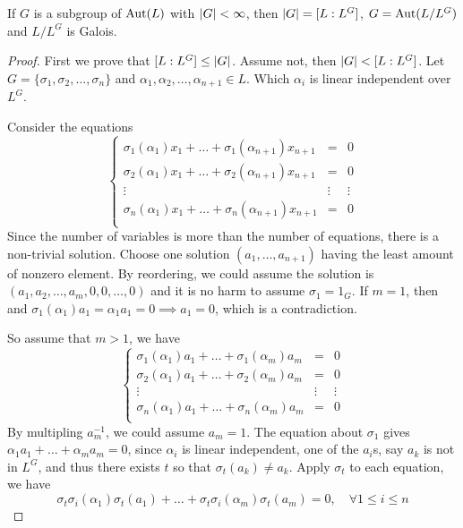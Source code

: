 \begin{theorem} \label{thm:extension-of-fix-field-is-galois}
  If $G$ is a subgroup of $\operatorname{Aut}(L)$ with $\lvert G\rvert < \infty$, then $\lvert G\rvert = [L: L^G]$, $G = \operatorname{Aut}(L / L^G)$
  and $L / L^G$ is Galois.

  \begin{proof}
    First we prove that $[L: L^G] \leq \lvert G\rvert$. Assume not, then $\lvert G\rvert < [L: L^G]$.
    Let $G = \{\sigma_1, \sigma_2, \dots, \sigma_n\}$ and $\alpha_1, \alpha_2, \dots, \alpha_{n+1} \in L$.
    Which $\alpha_i$ is linear independent over $L^G$.

    Consider the equations
    \[
      \left\{
        \begin{array}{ccc}
          \sigma_1(\alpha_1) x_1 + \dots + \sigma_1(\alpha_{n+1}) x_{n+1} &=& 0 \\
          \sigma_2(\alpha_1) x_1 + \dots + \sigma_2(\alpha_{n+1}) x_{n+1} &=& 0 \\
          \vdots &\vdots& \vdots \\
          \sigma_n(\alpha_1) x_1 + \dots + \sigma_n(\alpha_{n+1}) x_{n+1} &=& 0 \\
        \end{array}
      \right.
    \]
    Since the number of variables is more than the number of equations, there is a
    non-trivial solution. Choose one solution $(a_1, \dots, a_{n+1})$ having the
    least amount of nonzero element. By reordering, we could assume
    the solution is $(a_1, a_2, \dots, a_m, 0, 0, \dots, 0)$ and it is no harm to assume $\sigma_1 = 1_G$.
    If $m = 1$, then and $\sigma_1(\alpha_1) a_1 = \alpha_1 a_1 = 0 \implies a_1 = 0$,
    which is a contradiction.

    So assume that $m > 1$, we have
    \[
      \left\{
        \begin{array}{ccc}
          \sigma_1(\alpha_1) a_1 + \dots + \sigma_1(\alpha_{m}) a_{m} &=& 0 \\
          \sigma_2(\alpha_1) a_1 + \dots + \sigma_2(\alpha_{m}) a_{m} &=& 0 \\
          \vdots &\vdots& \vdots \\
          \sigma_n(\alpha_1) a_1 + \dots + \sigma_n(\alpha_{m}) a_{m} &=& 0 \\
        \end{array}
      \right.
    \]
    By multipling $a_m^{-1}$, we could assume $a_m = 1$. The equation about $\sigma_1$ gives
    $\alpha_1 a_1 + \dots + \alpha_m a_m = 0$, since $\alpha_i$ is linear independent,
    one of the $a_i$s, say $a_k$ is not in $L^G$, and thus there exists $t$ so that $\sigma_t(a_k) \neq a_k$.
    Apply $\sigma_t$ to each equation, we have
    \[ \sigma_t\sigma_i(\alpha_1) \sigma_t(a_1) + \dots + \sigma_t \sigma_i(\alpha_m) \sigma_t(a_m) = 0,\quad
      \forall 1 \leq i \leq n \]


\end{proof}
\end{theorem}
